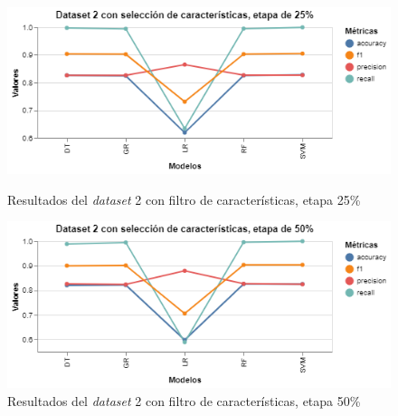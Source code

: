 \begin{figure}[htbp]
    \centering
    \begin{minipage}[t]{0.50\textwidth}
        \centering
        \includegraphics[width = \textwidth]{Graphics/dataset_2_fs_25.png}
        \caption{Resultados del \textit{dataset} 2 con filtro de características, etapa 25\%}
        \label{dataset2_fs_25}
    \end{minipage}\hfill
    \begin{minipage}[t]{0.50\textwidth}
        \centering
        \includegraphics[width = \textwidth]{Graphics/dataset_2_fs_50.png}
        \caption{Resultados del \textit{dataset} 2 con filtro de características, etapa 50\%}
        \label{dataset2_fs_50}
    \end{minipage}
\end{figure}

